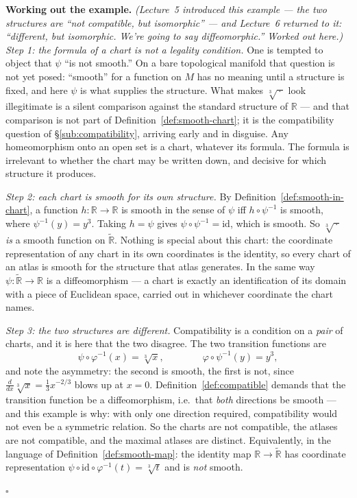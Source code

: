 \documentclass[11pt]{report}
\renewenvironment{proof}[1][Proof]{\noindent\textbf{#1.} }{\hfill$\square$\par\vspace{5pt}}
\begin{document}
\begin{proof}[Working out the example]
\textit{(Lecture~5 introduced this example --- the two structures are ``not compatible, but isomorphic'' --- and Lecture~6 returned to it: ``different, but isomorphic. We're going to say diffeomorphic.'' Worked out here.)} \emph{Step 1: the formula of a chart is not a legality condition.} One is tempted to object that $\psi$ ``is not smooth.'' On a bare topological manifold that question is not yet posed: ``smooth'' for a function on $M$ has no meaning until a structure is fixed, and here $\psi$ is what supplies the structure. What makes $\sqrt[3]{\,\cdot\,}$ look illegitimate is a silent comparison against the standard structure of $\mathbb{R}$ --- and that comparison is not part of Definition~\ref{def:smooth-chart}; it is the compatibility question of \S\ref{sub:compatibility}, arriving early and in disguise. Any homeomorphism onto an open set is a chart, whatever its formula. The formula is irrelevant to whether the chart may be written down, and decisive for which structure it produces.

\emph{Step 2: each chart is smooth for its own structure.} By Definition~\ref{def:smooth-in-chart}, a function $h : \mathbb{R} \to \mathbb{R}$ is smooth in the sense of $\psi$ iff $h \circ \psi^{-1}$ is smooth, where $\psi^{-1}(y) = y^3$. Taking $h = \psi$ gives $\psi \circ \psi^{-1} = \mathrm{id}$, which is smooth. So $\sqrt[3]{\,\cdot\,}$ \emph{is} a smooth function on $\widetilde{\mathbb{R}}$. Nothing is special about this chart: the coordinate representation of any chart in its own coordinates is the identity, so every chart of an atlas is smooth for the structure that atlas generates. In the same way $\psi : \widetilde{\mathbb{R}} \to \mathbb{R}$ is a diffeomorphism --- a chart is exactly an identification of its domain with a piece of Euclidean space, carried out in whichever coordinate the chart names.

\emph{Step 3: the two structures are different.} Compatibility is a condition on a \emph{pair} of charts, and it is here that the two disagree. The two transition functions are
\[
\psi \circ \varphi^{-1}(x) = \sqrt[3]{x}, \qquad\qquad \varphi \circ \psi^{-1}(y) = y^3,
\]
and note the asymmetry: the second is smooth, the first is not, since $\tfrac{d}{dx}\sqrt[3]{x} = \tfrac13 x^{-2/3}$ blows up at $x = 0$. Definition~\ref{def:compatible} demands that the transition function be a diffeomorphism, i.e.\ that \emph{both} directions be smooth --- and this example is why: with only one direction required, compatibility would not even be a symmetric relation. So the charts are not compatible, the atlases are not compatible, and the maximal atlases are distinct. Equivalently, in the language of Definition~\ref{def:smooth-map}: the identity map $\mathbb{R} \to \widetilde{\mathbb{R}}$ has coordinate representation $\psi \circ \mathrm{id} \circ \varphi^{-1}(t) = \sqrt[3]{t}$ and is \emph{not} smooth.


\end{proof}
\end{document}
